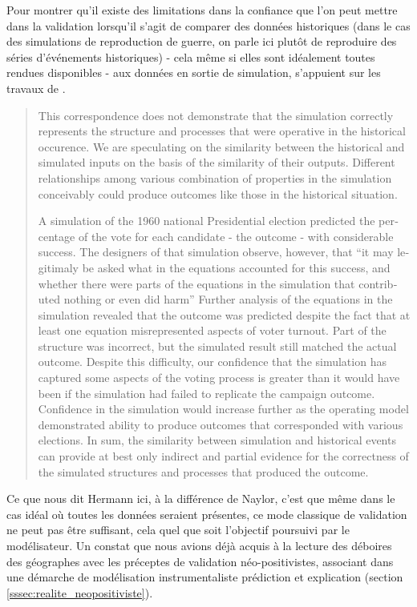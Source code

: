 Pour montrer qu'il existe des limitations dans la confiance que l'on peut mettre dans la validation lorsqu'il s'agit de comparer des données historiques (dans le cas des simulations de reproduction de guerre, on parle ici plutôt de reproduire des séries d'événements historiques) - cela même si elles sont idéalement toutes rendues disponibles - aux données en sortie de simulation, \textcite{Hermann1967b} s'appuient sur les travaux de \textcite{Pool1965}.

\foreignblockquote{english}[\cite{Pool1965}]{This correspondence does not demonstrate that the simulation correctly represents the structure and processes that were operative in the historical occurence. We are speculating on the similarity between the historical and simulated inputs on the basis of the similarity of their outputs. Different relationships among various combination of properties in the simulation conceivably could produce outcomes like those in the historical situation.

A simulation of the 1960 national Presidential election predicted the percentage of the vote for each candidate - the outcome - with considerable success. The designers of that simulation observe, however, that \enquote{it may legitimaly be asked what in the equations accounted for this success, and whether there were parts of the equations in the simulation that contributed nothing or even did harm} Further analysis of the equations in the simulation revealed that the outcome was predicted despite the fact that at least one equation misrepresented aspects of voter turnout. Part of the structure was incorrect, but the simulated result still matched the actual outcome. Despite this difficulty, our confidence that the simulation has captured some aspects of the voting process is greater than it would have been if the simulation had failed to replicate the campaign outcome. Confidence in the simulation would increase further as the operating model demonstrated ability to produce outcomes that corresponded with various elections. In sum, the similarity between simulation and historical events can provide at best only indirect and partial evidence for the correctness of the simulated structures and processes that produced the outcome.}

Ce que nous dit Hermann ici, à la différence de Naylor, c'est que même dans le cas idéal où toutes les données seraient présentes, ce mode classique de validation ne peut pas être suffisant, cela quel que soit l'objectif poursuivi par le modélisateur. Un constat que nous avions déjà acquis à la lecture des déboires des géographes avec les préceptes de validation néo-positivistes, associant dans une démarche de modélisation instrumentaliste prédiction et explication (section \ref{sssec:realite_neopositiviste}).

